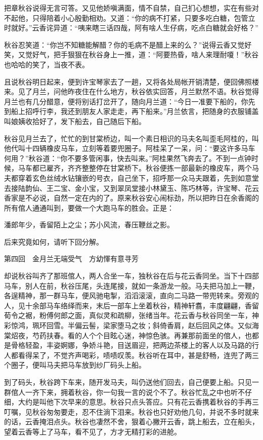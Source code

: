 \documentclass[12pt,UTF8]{ctexbook}
\begin{document}
{{{把章秋谷说得无言可答。又见他娇嗔满面，情不自禁，自己扪心想想，实在有些对不起他，只得陪着小心殷勤相劝。又道：“你的病不打紧，只要多吃白糖，包管立时就好。”云香诧异道：“咦来瞎三话四哉，阿有啥人生仔病，吃点白糖就会好格？”

秋谷忍笑道：“你岂不知糖能解醋？你的毛病不是醋上来的么？”说得云香又觉好笑，又觉好气，把手狠狠在秋谷身上一推，道：“阿要热昏，啥人来理耐嗄！”秋谷也哈哈的笑了，当夜不表。

且说秋谷明日起来，便到许宝琴家去了一趟，又将各处局帐开销清楚，便回佛照楼来。见了月兰，问他昨夜住在什么地方，秋谷依实回答，月兰默然不语。秋谷觉得月兰也有几分醋意，便将别话打岔开了，随向月兰道：“今日一准要下船的，你先到船上招呼行李，我还到朋友人家走走，再下船来。”月兰依言，把随身的衣服铺盖叫娘姨收拾好了，发下船去，自己随后下船。

秋谷见月兰去了，忙忙的到甘棠桥边，叫一个素日相识的马夫名叫歪毛阿桂的，叫他代叫十四辆橡皮马车，立刻等着要兜圈子。阿桂呆了一呆，问：“要这许多马车何用？”秋谷道：“你不要多管闲事，快去叫来。”阿桂果然飞奔去了。不到一点钟时候，马车都已雇齐，齐齐整整停在甘棠桥下。秋谷便拣一部最新的橡皮车，两个马夫都穿着玄色丝绒水钻镶嵌的号衣，自己坐下，招呼那一众马夫跟着，先到如意堂去接陆韵仙、王二宝、金小宝，又到翠凤堂接小林黛玉、陈巧林等，许宝琴、花云香家是不必说，自然一定在内的了。原来秋谷安心闹标劲，所以把昨日在余香阁的所有倌人通通叫到，要做一个大跑马车的胜会。正是：

潘郎年少，香留陌上之尘；苏小风流，春压鞭丝之影。

后来究竟如何，请听下回分解。





第四回　金月兰无端受气　方幼惲有意寻芳





却说秋谷叫齐了那班倌人，两人合坐一车，独秋谷在后与花云香同坐。当下十四部马车，别人在前，秋谷压尾，头连尾接，就如一条游龙一般。马夫把马加上一鞭，各逞精神，那一群马车，便风驰电掣，滔滔滚滚，直向二马路一带兜转来。旁观的人，见十余部马车络绎而来，末后一部车上坐着秋谷，精神轩翥，丰度翩翩，香留荀令之裾，粉傅何郎之面，真似灵和疏柳，张绪当年。花云香与秋谷同坐一车，神彩惊鸿，珮环回雪。半偏云髻，梁家堕马之妆；斜倚香肩，赵后回风之体。又似海棠炤夜，芍药扶春。看的人个个目眩心迷，神惊色骇。再兼那前面坐的倌人，也都是骨格轻盈，丰姿婀娜，争娇斗艳，目送眉迎，把两边茶楼上的客人以及马路的行人都看得呆了，不觉齐声喝彩，啧啧叹羡。秋谷听在耳中，甚是舒畅，连兜了两三个圈子，便叫马夫把马车放到纱厂码头上船。

到了码头，秋谷跨下车来，随开发马夫，叫仍送他们回去，自己便要上船。只见一群倌人一齐下来，拥着秋谷，你一句我一言的说个不了。秋谷忙乱之中也听不仔细，大约是叫他下次早来的意思。秋谷只点头答应。只有花云香携着秋谷的手再三叮嘱，见秋谷匆匆要走，忍不住淌下泪来。秋谷也只好劝他几句，并说不多时就来的话，云香掩泪点头。秋谷也凄然不舍，狠着心撇开云香，跳上船去，立在船头，望着云香等上了马车，看不见了，方才无精打彩的进舱。

}}}
\end{document}
